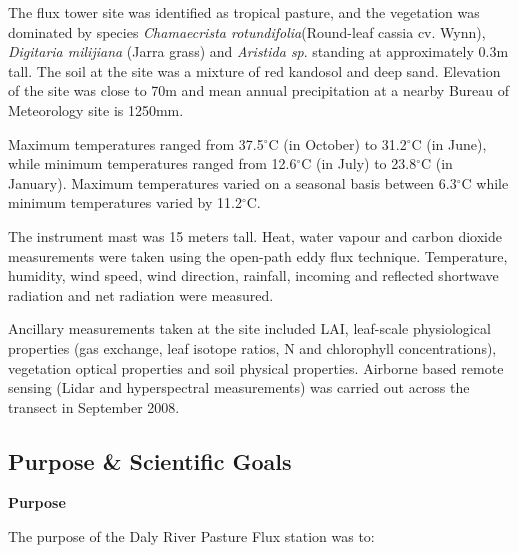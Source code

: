 \documentclass[11pt,a4paper]{article}
\begin{document}
The flux  tower site was identified as tropical pasture, and the vegetation was dominated by species \textit{Chamaecrista  rotundifolia}(Round-leaf cassia cv. Wynn), \textit{Digitaria milijiana} (Jarra grass) and \textit{Aristida sp}. standing at approximately 0.3m tall. The soil at the site was a mixture of red kandosol and deep sand. Elevation of the site was close to 70m and mean annual precipitation at a nearby Bureau of Meteorology site is 1250mm.

Maximum temperatures ranged from 37.5$^\circ$C (in October) to 31.2$^\circ$C  (in June), while minimum temperatures ranged from 12.6$^\circ$C (in July) to  23.8$^\circ$C (in January). Maximum temperatures varied on a seasonal basis between 6.3$^\circ$C while minimum temperatures varied by 11.2$^\circ$C.

The instrument mast was 15 meters tall. Heat, water vapour and carbon dioxide measurements were taken using the open-path eddy flux technique. Temperature, humidity, wind speed, wind  direction, rainfall, incoming and reflected shortwave radiation and net  radiation were measured.

Ancillary measurements taken at the site included LAI, leaf-scale physiological properties (gas exchange, leaf isotope ratios, N and chlorophyll concentrations), vegetation optical  properties and soil physical properties. Airborne based remote sensing (Lidar  and hyperspectral measurements) was carried out across the transect in  September 2008.

\subsection*{Purpose \& Scientific Goals}

\textbf{Purpose}

The  purpose of the Daly River Pasture Flux station was to:
\end{document}
